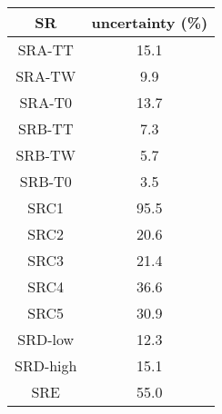 \begin{tabular}{c||c} \hline\hline
{\bf SR} & {\bf uncertainty (\%)} \\ \hline
SRA-TT & 15.1\\ \hline
SRA-TW & 9.9\\ \hline
SRA-T0 & 13.7\\ \hline
SRB-TT & 7.3\\ \hline
SRB-TW & 5.7\\ \hline
SRB-T0 & 3.5\\ \hline
SRC1   & 95.5\\ \hline
SRC2   & 20.6\\ \hline
SRC3   & 21.4\\ \hline
SRC4   & 36.6\\ \hline
SRC5   & 30.9\\ \hline
SRD-low & 12.3\\ \hline
SRD-high & 15.1\\ \hline
SRE & 55.0\\ \hline
\hline
\end{tabular}
